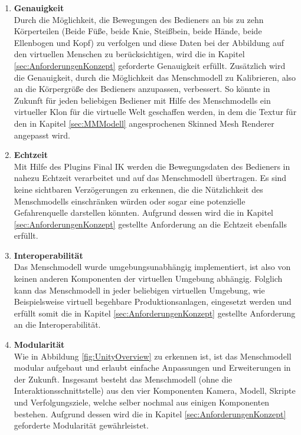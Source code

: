 \begin{enumerate}
	\item \textbf{Genauigkeit} \\
	Durch die Möglichkeit, die Bewegungen des Bedieners an bis zu zehn Körperteilen (Beide Füße, beide Knie, Steißbein, beide Hände, beide Ellenbogen und Kopf) zu verfolgen und diese Daten bei der Abbildung auf den virtuellen Menschen zu berücksichtigen, wird die in Kapitel \ref{sec:AnforderungenKonzept} geforderte Genauigkeit erfüllt. Zusätzlich wird die Genauigkeit, durch die Möglichkeit das Menschmodell zu Kalibrieren, also an die Körpergröße des Bedieners anzupassen, verbessert. So könnte in Zukunft für jeden beliebigen Bediener mit Hilfe des Menschmodells ein virtueller Klon für die virtuelle Welt geschaffen werden, in dem die Textur für den in Kapitel \ref{sec:MMModell} angesprochenen Skinned Mesh Renderer angepasst wird.
	\item \textbf{Echtzeit} \\
	Mit Hilfe des Plugins Final IK werden die Bewegungsdaten des Bedieners in nahezu Echtzeit verarbeitet und auf das Menschmodell übertragen. Es sind keine sichtbaren Verzögerungen zu erkennen, die die Nützlichkeit des Menschmodells einschränken würden oder sogar eine potenzielle Gefahrenquelle darstellen könnten. Aufgrund dessen wird die in Kapitel \ref{sec:AnforderungenKonzept} gestellte Anforderung an die Echtzeit ebenfalls erfüllt.
	\item \textbf{Interoperabilität} \\
	Das Menschmodell wurde umgebungsunabhängig implementiert, ist also von keinen anderen Komponenten der virtuellen Umgebung abhängig. Folglich kann das Menschmodell in jeder beliebigen virtuellen Umgebung, wie Beispielsweise virtuell begehbare Produktionsanlagen, eingesetzt werden und erfüllt somit die in Kapitel \ref{sec:AnforderungenKonzept} gestellte Anforderung an die Interoperabilität.
	\item \textbf{Modularität} \\
	Wie in Abbildung \ref{fig:UnityOverview} zu erkennen ist, ist das Menschmodell modular aufgebaut und erlaubt einfache Anpassungen und Erweiterungen in der Zukunft. Insgesamt besteht das Menschmodell (ohne die Interaktionsschnittstelle) aus den vier Komponenten Kamera, Modell, Skripte und Verfolgungsziele, welche selber nochmal aus einigen Komponenten bestehen. Aufgrund dessen wird die in Kapitel \ref{sec:AnforderungenKonzept} geforderte Modularität gewährleistet.
\end{enumerate}

